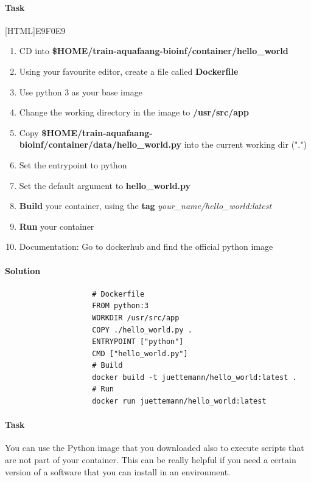 \documentclass[12pt]{article}
\begin{document}
		\paragraph{Task}
			[HTML]{E9F0E9}{\parbox{\linewidth}{%
					\begin{enumerate}
						\item CD into \textbf{\$HOME/train-aquafaang-bioinf/container/hello\_world}
						\item Using your favourite editor, create a file called \textbf{Dockerfile}
						\item Use python 3 as your base image
						\item Change the working directory in the image to \textbf{/usr/src/app}
						\item Copy \textbf{ \$HOME/train-aquafaang-bioinf/container/data/hello\_world.py} into the current working dir (".")
						\item Set the entrypoint to python
						\item Set the default argument to \textbf{hello\_world.py}
						\item  \textbf{Build} your container, using the \textbf{tag} \textit{your\_name/hello\_world:latest}
						\item \textbf{Run} your container
						\item Documentation: Go to dockerhub and find the official python image
					\end{enumerate}
			}}
		
		\paragraph{Solution}	
		
			\begin{minipage}{\linewidth}
				\begin{lstlisting}
					# Dockerfile
					FROM python:3
					WORKDIR /usr/src/app
					COPY ./hello_world.py .
					ENTRYPOINT ["python"]
					CMD ["hello_world.py"]
					# Build
					docker build -t juettemann/hello_world:latest .
					# Run
					docker run juettemann/hello_world:latest
				\end{lstlisting}
			\end{minipage}
	
			\paragraph{Task}
			
			You can use the Python image that you downloaded also to execute scripts that are not part of your container.
			This can be really helpful if you need a certain version of a software that you can install in an environment.
			
\end{document}
